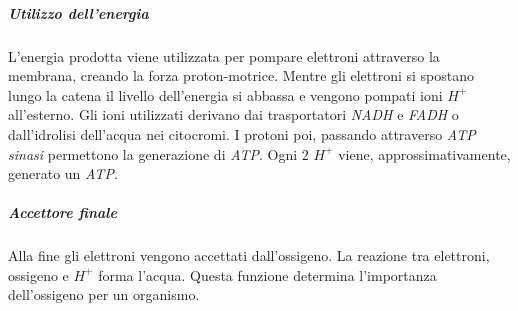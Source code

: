 					\subparagraph{Utilizzo dell'energia}
					L'energia prodotta viene utilizzata per pompare elettroni attraverso la membrana, creando la forza proton-motrice. 
					Mentre gli elettroni si spostano lungo la catena il livello dell'energia si abbassa e vengono pompati ioni \emph{$H^{+}$} all'esterno.
					Gli ioni utilizzati derivano dai trasportatori \emph{NADH} e \emph{FADH} o dall'idrolisi dell'acqua nei citocromi.
					I protoni poi, passando attraverso \emph{ATP sinasi} permettono la generazione di \emph{ATP}.
					Ogni $2$ \emph{$H^{+}$} viene, approssimativamente, generato un \emph{ATP}.

					\subparagraph{Accettore finale}
					Alla fine gli elettroni vengono accettati dall'ossigeno. 
					La reazione tra elettroni, ossigeno e \emph{$H^{+}$} forma l'acqua. 
					Questa funzione determina l'importanza dell'ossigeno per un organismo.

